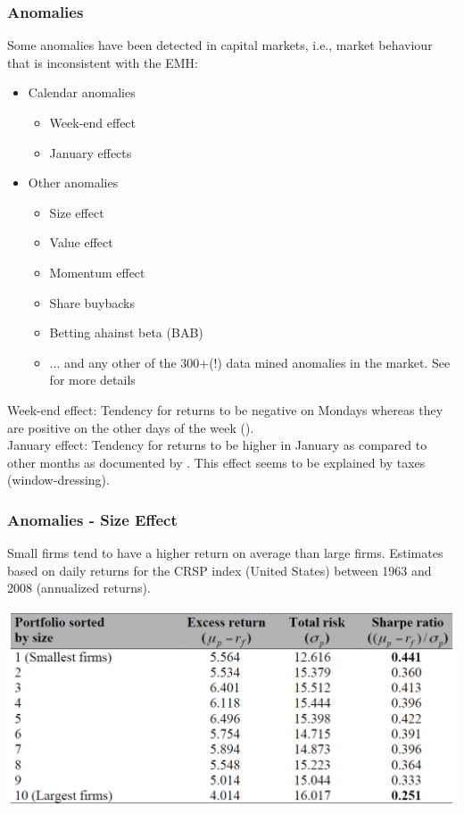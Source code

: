 \documentclass[xcolor=dvipsnames, english, 8pt]{beamer}
\begin{document}
\begin{frame}
    \frametitle{Anomalies}
Some anomalies have been detected in capital markets, i.e., market behaviour that is inconsistent with the EMH:\vspace{0.25cm}\\
\begin{itemize}
    \item Calendar anomalies
    \begin{itemize}
        \item Week-end effect
        \item January effects
    \end{itemize}
    \item Other anomalies
    \begin{itemize}
        \item Size effect
        \item Value effect
        \item Momentum effect
        \item Share buybacks
        \item Betting ahainst beta (BAB)
        \item ... and any other of the 300+(!) data mined anomalies in the market. See \cite{Harvey2016} for more details \vspace{0.5cm}\\
    \end{itemize}
\end{itemize}
{\color{ubRed}Week-end effect:} Tendency for returns to be negative on Mondays whereas they are positive on the other
days of the week (\cite{French1980}).\vspace{0.25cm}\\
{\color{ubRed}January effect:} Tendency for returns to be higher in January as compared to other months as documented by \cite{Rozeff1976}. This effect seems to be explained by taxes (window-dressing).
\end{frame}

\begin{frame}
    \frametitle{Anomalies - Size Effect}
{\color{ubRed}Small firms} tend to have a higher return on average than {\color{ubRed}large firms}. Estimates based on daily returns for the CRSP index (United States) between 1963 and 2008 (annualized returns).\vspace{0.25cm}\\
\begin{center}
    \includegraphics[scale=0.4]{ANO1}
\end{center}
\end{frame}
\end{document}
